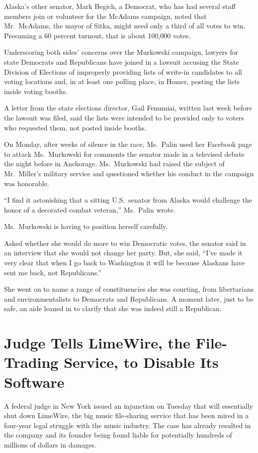 ﻿\documentclass[12pt]{article}
\begin{document}
Alaska's other senator, Mark Begich, a Democrat, who has had several staff members join or volunteer
for the McAdams campaign, noted that Mr.~McAdams, the mayor of Sitka, might need only a third of all
votes to win. Presuming a 60 percent turnout, that is about 100,000 votes.

Underscoring both sides' concerns over the Murkowski campaign, lawyers for state Democrats and
Republicans have joined in a lawsuit accusing the State Division of Elections of improperly
providing lists of write-in candidates to all voting locations and, in at least one polling place,
in Homer, posting the lists inside voting booths.

A letter from the state elections director, Gail Fenumiai, written last week before the lawsuit was
filed, said the lists were intended to be provided only to voters who requested them, not posted
inside booths.

On Monday, after weeks of silence in the race, Ms.~Palin used her Facebook page to attack
Ms.~Murkowski for comments the senator made in a televised debate the night before in Anchorage.
Ms.~Murkowski had raised the subject of Mr.~Miller's military service and questioned whether his
conduct in the campaign was honorable.

``I find it astonishing that a sitting U.S.~senator from Alaska would challenge the honor of a
decorated combat veteran,'' Ms.~Palin wrote.

Ms.~Murkowski is having to position herself carefully.

Asked whether she would do more to win Democratic votes, the senator said in an interview that she
would not change her party. But, she said, ``I've made it very clear that when I go back to
Washington it will be because Alaskans have sent me back, not Republicans.''

She went on to name a range of constituencies she was courting, from libertarians and
environmentalists to Democrats and Republicans. A moment later, just to be safe, an aide leaned in
to clarify that she was indeed still a Republican.

\section{Judge Tells LimeWire, the File-Trading Service, to Disable Its Software}

\lettrine{A}{} federal judge in New York issued an injunction on Tuesday
that will essentially shut down LimeWire, the big music file-sharing service that has been mired in
a four-year legal struggle with the music industry. The case has already resulted in the company and
its founder being found liable for potentially hundreds of millions of dollars in damages.
\end{document}
